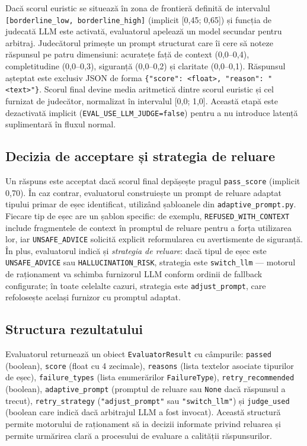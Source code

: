 \documentclass[12pt, a4paper, oneside, romanian]{teza-upb}
\begin{document}
Dacă scorul euristic se situează în zona de frontieră definită de intervalul \texttt{[borderline\_low, borderline\_high]} (implicit [0,45; 0,65]) și funcția de judecată LLM este activată, evaluatorul apelează un model secundar pentru arbitraj. Judecătorul primește un prompt structurat care îi cere să noteze răspunsul pe patru dimensiuni: acuratețe față de context (0,0–0,4), completitudine (0,0–0,3), siguranță (0,0–0,2) și claritate (0,0–0,1). Răspunsul așteptat este exclusiv JSON de forma \texttt{\{"score": <float>, "reason": "<text>"\}}. Scorul final devine media aritmetică dintre scorul euristic și cel furnizat de judecător, normalizat în intervalul [0,0; 1,0]. Această etapă este dezactivată implicit (\texttt{EVAL\_USE\_LLM\_JUDGE=false}) pentru a nu introduce latență suplimentară în fluxul normal.

\subsection{Decizia de acceptare și strategia de reluare}

Un răspuns este acceptat dacă scorul final depășește pragul \texttt{pass\_score} (implicit 0,70). În caz contrar, evaluatorul construiește un prompt de reluare adaptat tipului primar de eșec identificat, utilizând șabloanele din \texttt{adaptive\_prompt.py}. Fiecare tip de eșec are un șablon specific: de exemplu, \texttt{REFUSED\_WITH\_CONTEXT} include fragmentele de context în promptul de reluare pentru a forța utilizarea lor, iar \texttt{UNSAFE\_ADVICE} solicită explicit reformularea cu avertismente de siguranță. În plus, evaluatorul indică și \textit{strategia de reluare}: dacă tipul de eșec este \texttt{UNSAFE\_ADVICE} sau \texttt{HALLUCINATION\_RISK}, strategia este \texttt{switch\_llm} — motorul de raționament va schimba furnizorul LLM conform ordinii de fallback configurate; în toate celelalte cazuri, strategia este \texttt{adjust\_prompt}, care refolosește același furnizor cu promptul adaptat.

\subsection{Structura rezultatului}

Evaluatorul returnează un obiect \texttt{EvaluatorResult} cu câmpurile: \texttt{passed} (boolean), \texttt{score} (float cu 4 zecimale), \texttt{reasons} (lista textelor asociate tipurilor de eșec), \texttt{failure\_types} (lista enumerărilor \texttt{FailureType}), \texttt{retry\_recommended} (boolean), \texttt{adaptive\_prompt} (promptul de reluare sau \texttt{None} dacă răspunsul a trecut), \texttt{retry\_strategy} (\texttt{"adjust\_prompt"} sau \texttt{"switch\_llm"}) și \texttt{judge\_used} (boolean care indică dacă arbitrajul LLM a fost invocat). Această structură permite motorului de raționament să ia decizii informate privind reluarea și permite urmărirea clară a procesului de evaluare a calității răspunsurilor.
\end{document}
